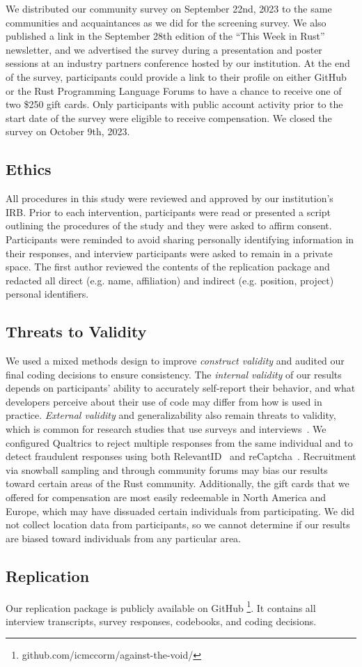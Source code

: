 We distributed our community survey on September 22nd, 2023 to the same communities and acquaintances as we did for the screening survey. We also published a link in the September 28th edition of the ``This Week in Rust'' newsletter, and we advertised the survey during a presentation and poster sessions at an industry partners conference hosted by our institution. At the end of the survey, participants could provide a link to their profile on either GitHub or the Rust Programming Language Forums to have a chance to receive one of two \$250 gift cards. Only participants with public account activity prior to the start date of the survey were eligible to receive compensation. We closed the survey on October 9th, 2023.

\subsection{Ethics} 
All procedures in this study were reviewed and approved by our institution's IRB. Prior to each intervention, participants were read or presented a script outlining the procedures of the study and they were asked to affirm consent. Participants were reminded to avoid sharing personally identifying information in their responses, and interview participants were asked to remain in a private space. The first author reviewed the contents of the replication package and redacted all direct (e.g. name, affiliation) and indirect (e.g. position, project) personal identifiers.

\subsection{Threats to Validity} 
We used a mixed methods design to improve \textit{construct validity} and audited our final coding decisions to ensure consistency. The \textit{internal validity} of our results depends on participants' ability to accurately self-report their behavior, and what developers perceive about their use of \unsafe code may differ from how \unsafe is used in practice. \textit{External validity} and generalizability also remain threats to validity, which is common for research studies that use surveys and interviews~\cite{Yin09}. We configured Qualtrics to reject multiple responses from the same individual and to detect fraudulent responses using both RelevantID~\cite{relevantid} and reCaptcha~\cite{liu18}. Recruitment via snowball sampling and through community forums may bias our results toward certain areas of the Rust community. Additionally, the gift cards that we offered for compensation are most easily redeemable in North America and Europe, which may have dissuaded certain individuals from participating. We did not collect location data from participants, so we cannot determine if our results are biased toward individuals from any particular area.

\subsection{Replication}
Our replication package is publicly available on GitHub \footnote {github.com/icmccorm/against-the-void/}. It contains all interview transcripts, survey responses, codebooks, and coding decisions.